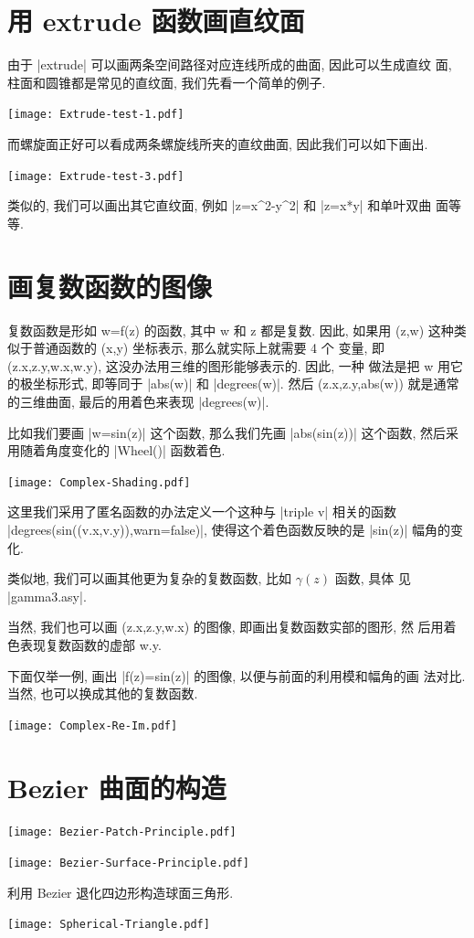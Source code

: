 \documentclass[nofonts,CJKnormalspaces]{ctexbook}
\begin{document}
\section{用 extrude 函数画直纹面}
由于 |extrude| 可以画两条空间路径对应连线所成的曲面, 因此可以生成直纹
面, 柱面和圆锥都是常见的直纹面, 我们先看一个简单的例子.
\begin{center}\texttt{[image: Extrude-test-1.pdf]}\end{center}%

而螺旋面正好可以看成两条螺旋线所夹的直纹曲面, 因此我们可以如下画出.
\begin{center}\texttt{[image: Extrude-test-3.pdf]}\end{center}%

类似的, 我们可以画出其它直纹面, 例如 |z=x^2-y^2| 和 |z=x*y| 和单叶双曲
面等等.

\section{画复数函数的图像}
复数函数是形如 w=f(z) 的函数, 其中 w 和 z 都是复数. 因此, 如果用
(z,w) 这种类似于普通函数的 (x,y) 坐标表示, 那么就实际上就需要 4 个
变量, 即 (z.x,z.y,w.x,w.y), 这没办法用三维的图形能够表示的. 因此, 一种
做法是把 w 用它的极坐标形式, 即等同于 |abs(w)| 和 |degrees(w)|. 然后
(z.x,z.y,abs(w)) 就是通常的三维曲面, 最后的用着色来表现 |degrees(w)|.

比如我们要画 |w=sin(z)| 这个函数, 那么我们先画 |abs(sin(z))| 这个函数,
然后采用随着角度变化的 |Wheel()| 函数着色.
\begin{center}\texttt{[image: Complex-Shading.pdf]}\end{center}%

这里我们采用了匿名函数的办法定义一个这种与 |triple v| 相关的函数
|degrees(sin((v.x,v.y)),warn=false)|, 使得这个着色函数反映的是
|sin(z)| 幅角的变化.

类似地, 我们可以画其他更为复杂的复数函数, 比如 $\gamma(z)$ 函数, 具体
见 |gamma3.asy|.

当然, 我们也可以画 (z.x,z.y,w.x) 的图像, 即画出复数函数实部的图形, 然
后用着色表现复数函数的虚部 w.y.

下面仅举一例, 画出 |f(z)=sin(z)| 的图像, 以便与前面的利用模和幅角的画
法对比. 当然, 也可以换成其他的复数函数.
\begin{center}\texttt{[image: Complex-Re-Im.pdf]}\end{center}%



\section{Bezier 曲面的构造}
\begin{center}\texttt{[image: Bezier-Patch-Principle.pdf]}\end{center}%

\begin{center}\texttt{[image: Bezier-Surface-Principle.pdf]}\end{center}%

利用 Bezier 退化四边形构造球面三角形.
\begin{center}\texttt{[image: Spherical-Triangle.pdf]}\end{center}%

\end{document}
